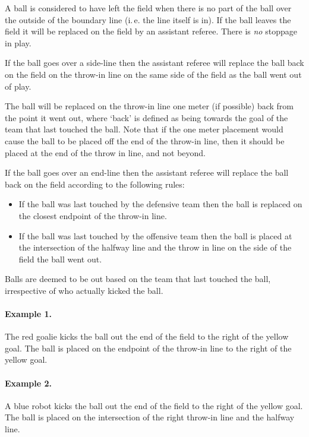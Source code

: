 \documentclass[12pt]{article}
\newcommand{\ie}{\mbox{i.\,e.}\xspace}
\begin{document}
A ball is considered to have left the field when there is no part of the ball over the outside of the boundary line (\ie the line itself is in). If the ball leaves the field it will be replaced on the field by an assistant referee. There is \emph{no} stoppage in play.

If the ball goes over a side-line then the assistant referee will replace the ball back on the field on the throw-in line on the same side of the field as the ball went out of play.

The ball will be replaced on the throw-in line one meter (if possible) back from the point it went out, where `back' is defined as being towards the goal of the team that last touched the ball. Note that if the one meter placement would cause the ball to be placed off the end of the throw-in line, then it should be placed at the end of the throw in line, and not beyond.

If the ball goes over an end-line then the assistant referee will replace the ball back on the field according to the following rules:

\begin{itemize}

\item If the ball was last touched by the defensive team then the ball is replaced on the closest endpoint of the throw-in line.

\item If the ball was last touched by the offensive team then the ball is placed at the intersection of the halfway line and the throw in line on the side of the field the ball went out.

\end{itemize}

Balls are deemed to be out based on the team that last touched the ball, irrespective of who actually kicked the ball.

\paragraph{Example 1.} The red goalie kicks the ball out the end of the field to the right of the yellow goal. The ball is placed on the endpoint of the throw-in line to the right of the yellow goal.

\paragraph{Example 2.} A blue robot kicks the ball out the end of the field to the right of the yellow goal. The ball is placed on the intersection of the right throw-in line and the halfway line.
\end{document}
